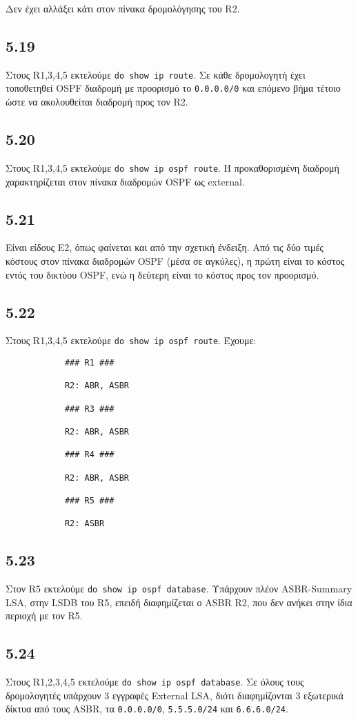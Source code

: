 \documentclass[a4paper, 12pt]{article}
\begin{document}
		Δεν έχει αλλάξει κάτι στον πίνακα δρομολόγησης του R2.

	\subsection*{5.19}
		Στους R1,3,4,5 εκτελούμε \verb|do show ip route|. Σε κάθε δρομολογητή έχει τοποθετηθεί OSPF διαδρομή με προορισμό το \verb|0.0.0.0/0| και επόμενο βήμα τέτοιο ώστε να ακολουθείται διαδρομή προς τον R2.

	\subsection*{5.20}
		Στους R1,3,4,5 εκτελούμε \verb|do show ip ospf route|. Η προκαθορισμένη διαδρομή χαρακτηρίζεται στον πίνακα διαδρομών OSPF ως external.

	\subsection*{5.21}
		Είναι είδους E2, όπως φαίνεται και από την σχετική ένδειξη. Από τις δύο τιμές κόστους στον πίνακα διαδρομών OSPF (μέσα σε αγκύλες), η πρώτη είναι το κόστος εντός του δικτύου OSPF, ενώ η δεύτερη είναι το κόστος προς τον προορισμό.

	\subsection*{5.22}
		Στους R1,3,4,5 εκτελούμε \verb|do show ip ospf route|. Έχουμε:
		
		\begin{verbatim}
			### R1 ###
			
			R2: ABR, ASBR
			
			### R3 ###

			R2: ABR, ASBR
			
			### R4 ###

			R2: ABR, ASBR
			
			### R5 ###

			R2: ASBR
		\end{verbatim}

	\subsection*{5.23}
		Στον R5 εκτελούμε \verb|do show ip ospf database|. Υπάρχουν πλέον ASBR-Summary LSA, στην LSDB του R5, επειδή διαφημίζεται ο ASBR R2, που δεν ανήκει στην ίδια περιοχή με τον R5.

	\subsection*{5.24}
		Στους R1,2,3,4,5 εκτελούμε \verb|do show ip ospf database|. Σε όλους τους δρομολογητές υπάρχουν 3 εγγραφές External LSA, διότι διαφημίζονται 3 εξωτερικά δίκτυα από τους ASBR, τα \verb|0.0.0.0/0|, \verb|5.5.5.0/24| και \verb|6.6.6.0/24|.
\end{document}

